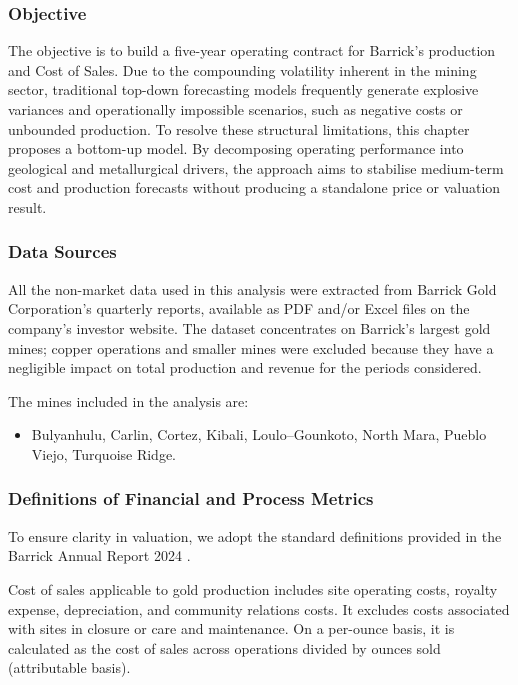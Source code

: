 \subsubsection{Objective}
The objective is to build a five-year operating contract for Barrick's production and Cost of Sales. Due to the compounding volatility inherent in the mining sector, traditional top-down forecasting models frequently generate explosive variances and operationally impossible scenarios, such as negative costs or unbounded production. To resolve these structural limitations, this chapter proposes a bottom-up model. By decomposing operating performance into geological and metallurgical drivers, the approach aims to stabilise medium-term cost and production forecasts without producing a standalone price or valuation result.
\subsubsection{Data Sources}
All the non-market data used in this analysis were extracted from Barrick Gold Corporation's quarterly reports, available as PDF and/or Excel files on the company's investor website. The dataset concentrates on Barrick's largest gold mines; copper operations and smaller mines were excluded because they have a negligible impact on total production and revenue for the periods considered.

The mines included in the analysis are:
\begin{itemize}
  \item Bulyanhulu, Carlin, Cortez, Kibali, Loulo--Gounkoto, North Mara, Pueblo Viejo, Turquoise Ridge.
\end{itemize}
\subsubsection{Definitions of Financial and Process Metrics}
To ensure clarity in valuation, we adopt the standard definitions provided in the Barrick Annual Report 2024 .

\begin{definition}
Cost of sales applicable to gold production includes site operating costs, royalty expense, depreciation, and community relations costs. It excludes costs associated with sites in closure or care and maintenance. On a per-ounce basis, it is calculated as the cost of sales across operations divided by ounces sold (attributable basis).
\end{definition}


